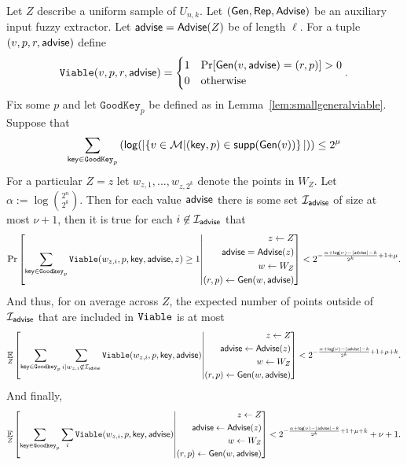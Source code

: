 \begin{lemma}
\label{lem:info loss}
Let $Z$ describe a uniform sample of $U_{n,k}$.  Let $({\mathsf{Gen}}, {\mathsf{Rep}}, {\mathsf{Advise}})$ be an auxiliary input fuzzy extractor.  Let ${\mathsf{advise}} = {\mathsf{Advise}}(Z)$ be of length $\ell$.  For a tuple $(v, p, r, {\mathsf{advise}})$ define 
\[
\mathtt{Viable}(v, p, r, {\mathsf{advise}}) = \begin{cases} 1& \Pr[{\mathsf{Gen}}(v, {\mathsf{advise}}) = (r, p)]>0\\0&\text{otherwise}\end{cases}.\]
Fix some $p$ and let $\mathtt{GoodKey}_p$ be defined as in Lemma~\ref{lem:smallgeneralviable}. Suppose that 
\[
   \sum_{\mathsf{key}\in \mathtt{GoodKey}_p} \left( \mathsf{log}\!\left(|\!\left\{ v \in \mathcal{M}|\!\left(\mathsf{key}, p\right) \in \mathsf{supp}\!\left(\mathsf{Gen}(v)\right) \right\}|\right)\right) \le 2^\mu 
 \]
 For a particular $Z=z$ let $w_{z,1},..., w_{z,2^k}$ denote the points in $W_Z$. Let $\alpha:= \log {2^n\choose 2^k}$.  
 Then for each value ${\mathsf{advise}}$ there is some set $\mathcal{I}_{{\mathsf{advise}}}$ of size at most $\nu+1$, then it is true for each $i\not \in \mathcal{I}_{\mathsf{advise}}$ that
\[
\Pr\left[\sum_{\mathsf{key} \in \mathtt{Goodkey}_p} \mathtt{Viable}(w_{z,i}, p, \mathsf{key}, {\mathsf{advise}}, z) \ge 1\middle| \begin{aligned} z\leftarrow Z\\ {\mathsf{advise}}= {\mathsf{Advise}}(z)\\w\leftarrow W_Z\\(r, p)\leftarrow {\ensuremath{\mathsf{Gen}}}(w, {\mathsf{advise}}) \end{aligned} \right]< 2^{-\frac{\alpha+\mathsf{log}\!\left(\nu\right)-|{\mathsf{advise}}|-k}{2^k}+1+\mu}.
\]
And thus, for on average across $Z$, the expected number of points outside of $\mathcal{I}_{\mathsf{advise}}$ that are included in $\mathtt{Viable}$ is at most 
\begin{align*}
\operatorname*{\mathbb{E}}_{Z} \left[\sum_{\mathsf{key} \in \mathtt{Goodkey}_p}\sum_{i | w_{z,i}\not\in\mathcal{I}_{\mathsf{advise}}} \mathtt{Viable}(w_{z,i}, p, \mathsf{key}, {\mathsf{advise}}) \middle| \begin{aligned} z\leftarrow Z\\ {\mathsf{advise}}\leftarrow {\ensuremath{\mathsf{Advise}}}(z)\\w\leftarrow W_Z\\(r, p)\leftarrow {\ensuremath{\mathsf{Gen}}}(w, {\mathsf{advise}})\end{aligned} \right]< 2^{-\frac{\alpha+\mathsf{log}\!\left(\nu\right) - |{\mathsf{advise}}|-k}{2^k}+1+\mu+k}.
\end{align*}
And finally, 
\begin{align*}
\operatorname*{\mathbb{E}}_{Z} \left[\sum_{\mathsf{key} \in \mathtt{Goodkey}_p}\sum_{i }  \mathtt{Viable}(w_{z,i}, p, \mathsf{key}, {\mathsf{advise}}) \middle| \begin{aligned} z\leftarrow Z\\ {\mathsf{advise}}\leftarrow {\ensuremath{\mathsf{Advise}}}(z)\\w\leftarrow W_Z\\(r, p)\leftarrow {\ensuremath{\mathsf{Gen}}}(w, {\mathsf{advise}})\end{aligned} \right]< 2^{-\frac{\alpha+\mathsf{log}\!\left(\nu\right)-|{\mathsf{advise}}|-k}{2^k}+1+\mu+k}+\nu+1.
\end{align*}

\end{lemma}
